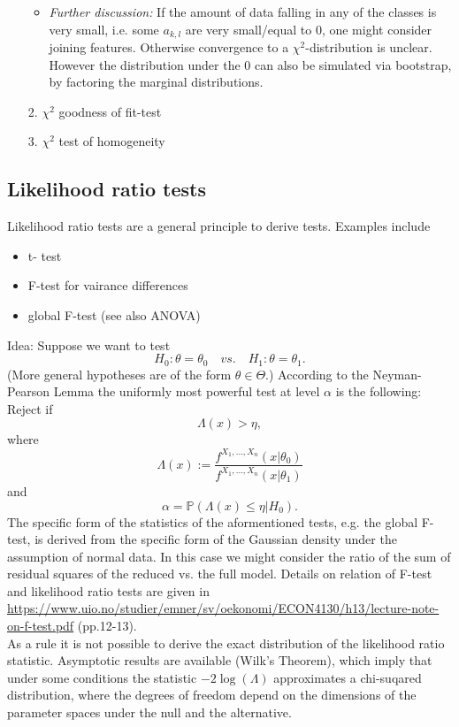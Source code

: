 \documentclass[12pt,a4paper]{amsart}
\theoremstyle{definition}
\theoremstyle{remark}
\numberwithin{equation}{section}
\begin{document}
\begin{itemize}
\begin{itemize}
\item \textit{Further discussion:} If the amount of data falling in any of the classes is very small, i.e. some $a_{k,l}$ are very small/equal to $0$, one might consider joining features. Otherwise convergence to a $\chi^2$-distribution is unclear. However the distribution under the $0$  can also be simulated via bootstrap, by factoring the marginal distributions.  \\



\end{itemize}
\item[2.] $\chi^2$ goodness of fit-test 
\item[3.] $\chi^2$ test of homogeneity
\end{itemize}

\subsection{Likelihood ratio tests} %

Likelihood ratio tests are a general principle to derive tests. Examples include

\begin{itemize}
\item t- test
\item F-test for vairance differences
\item global F-test (see also ANOVA)
\end{itemize}

Idea: Suppose we want to test
$$H_0: \theta=\theta_0 \quad vs. \quad H_1: \theta = \theta_1.$$
(More general hypotheses are of the form $\theta \in \Theta$.) According to the Neyman-Pearson Lemma the uniformly most powerful test at level $\alpha$ is the following: Reject if
$$\Lambda(x)>\eta,$$
where 
$$\Lambda(x):= \frac{f^{X_1,...,X_n}(x| \theta_0)}{f^{X_1,...,X_n}(x| \theta_1)}$$
and 
$$ \alpha= \mathbb{P}(\Lambda(x)\le \eta | H_0).$$
 The specific form of the statistics of the aformentioned tests, e.g. the global F-test, is derived from the specific form of the Gaussian density under the assumption of normal data. In this case we might consider the ratio of the sum of residual squares of the reduced vs. the full model. Details on relation of F-test and likelihood ratio tests are given in \url{https://www.uio.no/studier/emner/sv/oekonomi/ECON4130/h13/lecture-note-on-f-test.pdf} (pp.12-13).\\

As a rule it is not possible to derive the exact distribution of the likelihood ratio statistic. Asymptotic results are available (Wilk's Theorem), which imply that under some conditions the statistic $-2 \log(\Lambda)$ approximates a chi-suqared distribution, where the degrees of freedom depend on the dimensions of the parameter spaces under the null and the alternative.
\end{document}
